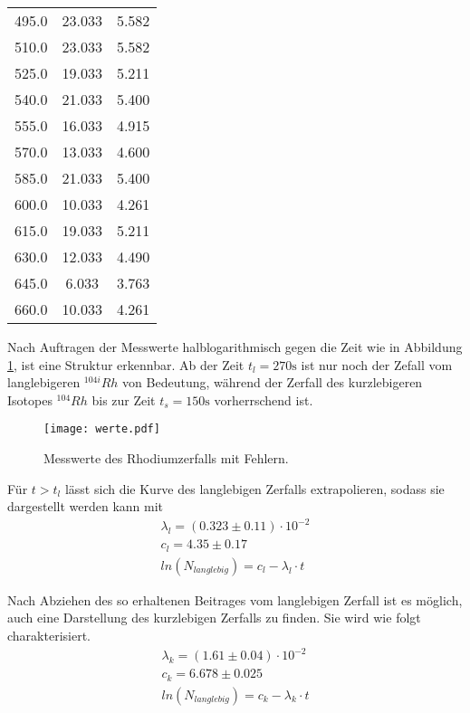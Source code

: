 \begin{table}
\begin{tabular}{c c c}
  495.0  & 23.033  & 5.582  \\
  510.0  & 23.033  & 5.582  \\
  525.0  & 19.033  & 5.211  \\
  540.0  & 21.033  & 5.400  \\
  555.0  & 16.033  & 4.915  \\
  570.0  & 13.033  & 4.600  \\
  585.0  & 21.033  & 5.400  \\
  600.0  & 10.033  & 4.261  \\
  615.0  & 19.033  & 5.211  \\
  630.0  & 12.033  & 4.490  \\
  645.0  & 6.033   & 3.763  \\
  660.0  & 10.033  & 4.261 \\
  \bottomrule
 \end{tabular}
\end{table}

\noindent Nach Auftragen der Messwerte halblogarithmisch gegen die Zeit wie in Abbildung \ref{fig:messf},
ist eine Struktur erkennbar. Ab der Zeit $t_l = 270 \si{\s}$ ist nur noch der Zefall vom langlebigeren $^{104i}Rh$
von Bedeutung, während der Zerfall des kurzlebigeren Isotopes $^{104}Rh$ bis zur Zeit $t_s = 150 \si{\s}$ vorherrschend ist.

\begin{figure}
 \centering
 \texttt{[image: werte.pdf]}
 \caption{Messwerte des Rhodiumzerfalls mit Fehlern.}
 \label{fig:messf}
\end{figure}

\noindent Für $t > t_l$ lässt sich die Kurve des langlebigen Zerfalls extrapolieren, sodass 
sie dargestellt werden kann mit
\begin{align*}
    \lambda_l = (0.323 \pm 0.11) \cdot 10^{-2}\\
    c_l = 4.35 \pm 0.17 \\
    ln(N_{langlebig}) = c_l - \lambda_l \cdot t
\end{align*}

Nach Abziehen des so erhaltenen Beitrages vom langlebigen Zerfall ist es möglich, auch
eine Darstellung des kurzlebigen Zerfalls zu finden. Sie wird wie folgt charakterisiert.
\begin{align*}
    \lambda_k = (1.61 \pm 0.04) \cdot 10^{-2}\\
    c_k = 6.678 \pm 0.025 \\
    ln(N_{langlebig}) = c_k - \lambda_k \cdot t
\end{align*}

